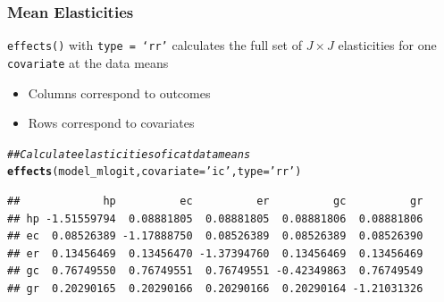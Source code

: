 \documentclass{beamer}\usepackage[]{graphicx}\usepackage[]{xcolor}
\makeatletter
\newcommand{\hlstr}[1]{\textcolor[rgb]{0.192,0.494,0.8}{#1}}%
\newcommand{\hlcom}[1]{\textcolor[rgb]{0.678,0.584,0.686}{\textit{#1}}}%
\newcommand{\hlstd}[1]{\textcolor[rgb]{0.345,0.345,0.345}{#1}}%
\newcommand{\hlkwc}[1]{\textcolor[rgb]{0.333,0.667,0.333}{#1}}%
\newcommand{\hlkwd}[1]{\textcolor[rgb]{0.737,0.353,0.396}{\textbf{#1}}}%
\newenvironment{kframe}{%
 \def\at@end@of@kframe{}%
 \ifinner\ifhmode%
  \def\at@end@of@kframe{\end{minipage}}%
  \begin{minipage}{\columnwidth}%
 \fi\fi%
 \def\FrameCommand##1{\hskip\@totalleftmargin \hskip-\fboxsep
 \colorbox{shadecolor}{##1}\hskip-\fboxsep
     \hskip-\linewidth \hskip-\@totalleftmargin \hskip\columnwidth}%
 \MakeFramed {\advance\hsize-\width
   \@totalleftmargin\z@ \linewidth\hsize
   \@setminipage}}%
 {\par\unskip\endMakeFramed%
 \at@end@of@kframe}
\newenvironment{knitrout}{}{} %
\makeatother
\begin{document}
\begin{frame}[fragile]\frametitle{Mean Elasticities}
	  \texttt{effects()} with \texttt{type = `rr'} calculates the full set of $J \times J$ elasticities for one \texttt{covariate} at the data means
	  \begin{itemize}
        \item Columns correspond to outcomes
        \item Rows correspond to covariates
    \end{itemize}
\begin{knitrout}\footnotesize
{}\color{fgcolor}\begin{kframe}
\begin{alltt}
\hlcom{## Calculate elasticities of ic at data means}
\hlkwd{effects}\hlstd{(model_mlogit,} \hlkwc{covariate} \hlstd{=} \hlstr{'ic'}\hlstd{,} \hlkwc{type} \hlstd{=} \hlstr{'rr'}\hlstd{)}
\end{alltt}
\begin{verbatim}
##             hp          ec          er          gc          gr
## hp -1.51559794  0.08881805  0.08881805  0.08881806  0.08881806
## ec  0.08526389 -1.17888750  0.08526389  0.08526389  0.08526390
## er  0.13456469  0.13456470 -1.37394760  0.13456469  0.13456469
## gc  0.76749550  0.76749551  0.76749551 -0.42349863  0.76749549
## gr  0.20290165  0.20290166  0.20290166  0.20290164 -1.21031326
\end{verbatim}
\end{kframe}
\end{knitrout}
\end{frame}
\end{document}
